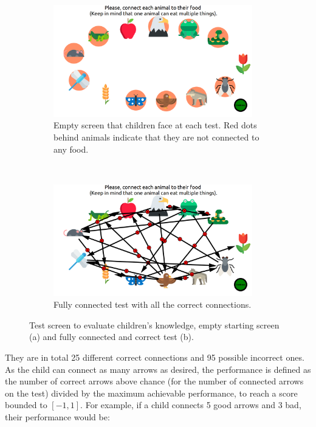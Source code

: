 \begin{figure}[ht]
	\centering
	\begin{subfigure}[t]{0.5\textwidth}
		\centering
		\includegraphics[width=0.95\textwidth]{empty_graph.png}
		\captionsetup{width=.95\linewidth}
		\caption{Empty screen that children face at each test. Red dots behind animals indicate that they are not connected to any food.}
	\end{subfigure}%
	~ 
	\begin{subfigure}[t]{0.5\textwidth}
		\centering
		\includegraphics[width=0.95\textwidth]{full_graph.png}
		\captionsetup{width=.95\linewidth}
		\caption{Fully connected test with all the correct connections.}
	\end{subfigure}
	\caption{Test screen to evaluate children's knowledge, empty starting screen (a) and fully connected and correct test (b).}
	\label{fig:test}
\end{figure}
They are in total 25 different correct connections and 95 possible incorrect ones. As the child can connect as many arrows as desired, the performance is defined as the number of correct arrows above chance (for the number of connected arrows on the test) divided by the maximum achievable performance, to reach a score bounded to $[-1,1]$. For example, if a child connects 5 good arrows and 3 bad, their performance would be:

